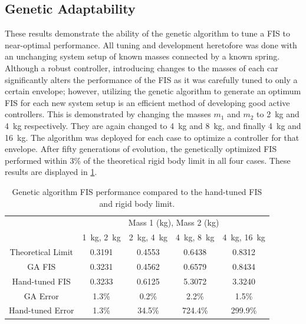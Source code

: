 \subsection{Genetic Adaptability}
These results demonstrate the ability of the genetic algorithm to tune a FIS
to near-optimal performance. All tuning and development heretofore was done with an unchanging system setup of
known masses connected by a known spring. Although a robust controller\cite{cohen:01jgcd}, introducing changes
to the masses of each car significantly alters the performance of the FIS as it was carefully tuned to only a
certain envelope; however, utilizing the genetic algorithm to generate an optimum FIS for each new system
setup is an efficient method of developing good active controllers. This is demonstrated by changing the
masses $m_1$ and $m_2$ to \SI{2}{\kilogram} and \SI{4}{\kilogram} respectively. They are again changed to
\SI{4}{\kilogram} and \SI{8}{\kilogram}, and finally \SI{4}{\kilogram} and \SI{16}{\kilogram}. The algorithm
was deployed for each case to optimize a controller for that envelope. After fifty generations of evolution,
the genetically optimized FIS performed within 3\% of the theoretical rigid body limit in all four cases.
These results are displayed in \cref{tab:gacomp}.  \begin{table} \centering \caption{Genetic algorithm
    FIS performance compared to the hand-tuned FIS and rigid body limit.} \label{tab:gacomp}
    \begin{tabular}{|c|c|c|c|c|} \cline{2-5} \multicolumn{1}{c|}{} & \multicolumn{4}{|c|}{Mass 1
        (\si{\kilogram}), Mass 2 (\si{\kilogram})} \\\cline{2-5} \multicolumn{1}{c|}{} & \SI{1}{\kilogram},
        \SI{2}{\kilogram} & \SI{2}{\kilogram}, \SI{4}{\kilogram} & \SI{4}{\kilogram}, \SI{8}{\kilogram} &
        \SI{4}{\kilogram}, \SI{16}{\kilogram} \\\hline Theoretical Limit & 0.3191 & 0.4553 & 0.6438 & 0.8312
        \\\hline GA FIS & 0.3231 & 0.4562 & 0.6579 & 0.8434 \\\hline Hand-tuned FIS & 0.3233 & 0.6125 & 5.3072
                        & 3.3240 \\\hline\hline GA Error & \multicolumn{1}{|d|}{1.3\%} &
        \multicolumn{1}{|d|}{0.2\%} & \multicolumn{1}{|d|}{2.2\%} & \multicolumn{1}{|d|}{1.5\%} \\\hline
        Hand-tuned Error & \multicolumn{1}{|d|}{1.3\%} & \multicolumn{1}{|d|}{34.5\%} &
        \multicolumn{1}{|d|}{724.4\%} & \multicolumn{1}{|d|}{299.9\%} \\\hline \end{tabular} \end{table}

